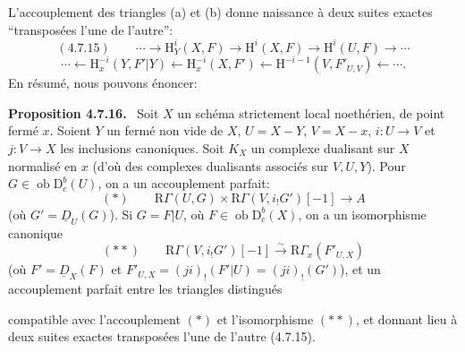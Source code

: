 \documentclass[11pt]{article}
\newenvironment{statement}[1]{\par\medskip\noindent\textbf{#1.}\ }{\par\medskip}
\renewcommand{\H}{\mathrm{H}}
\newcommand{\R}{\mathrm{R}}\newcommand{\RHomCore}{\mathrm{RHom}}
\newcommand{\D}{\mathrm{D}}
\newcommand{\ob}{\operatorname{ob}}
\providecommand{\ob}{\operatorname{ob}}
\providecommand{\R}{\mathrm R}
\begin{document}
L'accouplement des triangles (a) et (b) donne naissance à deux suites exactes ``transposées l'une de l'autre'':
\[
(4.7.15)\qquad \cdots\longrightarrow \H_Y^i(X,F)\longrightarrow\H^i(X,F)\longrightarrow\H^i(U,F)\longrightarrow\cdots
\]
\[
\cdots\longleftarrow \H_x^{-i}(Y,F'|Y)\longleftarrow\H_x^{-i}(X,F')\longleftarrow\H^{-i-1}(V,F'_{U,V})\longleftarrow\cdots.
\]
En résumé, nous pouvons énoncer:

\begin{statement}{Proposition 4.7.16}
Soit $X$ un schéma strictement local noethérien, de point fermé $x$. Soient $Y$ un fermé non vide de $X$, $U=X-Y$, $V=X-x$, $i:U\to V$ et $j:V\to X$ les inclusions canoniques. Soit $K_X$ un complexe dualisant sur $X$ normalisé en $x$ (d'où des complexes dualisants associés sur $V,U,Y$). Pour $G\in\ob\D_c^b(U)$, on a un accouplement parfait:
\[
(*)\qquad \R\Gamma(U,G)\times\R\Gamma(V,i_!G')[-1]\longrightarrow A
\]
(où $G'=\underline{D}_U(G)$). Si $G=F|U$, où $F\in\ob\D_c^b(X)$, on a un isomorphisme canonique
\[
(**)\qquad \R\Gamma(V,i_!G')[-1]\xrightarrow{\sim}\R\Gamma_x(F'_{U,X})
\]
(où $F'=\underline{D}_X(F)$ et $F'_{U,X}=(ji)_!(F'|U)=(ji)_!(G')$), et un accouplement parfait entre les triangles distingués
\begin{center}
\end{center}
compatible avec l'accouplement $(*)$ et l'isomorphisme $(**)$, et donnant lieu à deux suites exactes transposées l'une de l'autre (4.7.15).
\end{statement}
\end{document}
